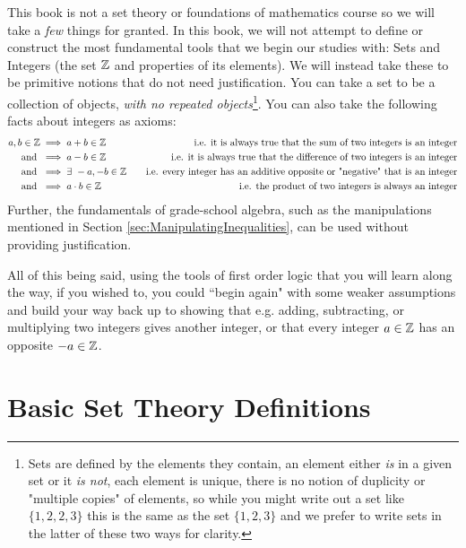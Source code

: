 This book is not a set theory or foundations of mathematics course so we will take a \textit{few} things for granted. In this book, we will not attempt to define or construct the most fundamental tools that we begin our studies with: Sets and Integers (the set ${\mathbb{Z}}$ and properties of its elements). We will instead take these to be primitive notions that do not need justification. You can take a set to be a collection of objects, \textit{with no repeated objects}\footnote{Sets are defined by the elements they contain, an element either \textit{is} in a given set or it \textit{is not}, each element is unique, there is no notion of duplicity or "multiple copies" of elements, so while you might write out a set like $\{1, 2, 2, 3\}$ this is the same as the set $\{1,2,3\}$ and we prefer to write sets in the latter of these two ways for clarity.}. You can also take the following facts about integers as axioms:
\noindent\begin{align}
    a,b\in \Z &\implies a+b\in \Z  \ \ \ &\text{i.e. it is always true that the sum of two integers is an integer}\nonumber \\
    \text{ and } &\implies a-b\in \Z \ \ \ &\text{i.e. it is always true that the difference of two integers is an integer}\nonumber \\
    \text{ and } &\implies \exists \ -a,-b \in \Z \ \ \ &\text{i.e. every integer has an additive opposite or "negative" that is an integer}\nonumber \\
     \text{ and } &\implies a\cdot b\in \Z \ \ \ &\text{i.e. the product of two integers is always an integer}\nonumber
\end{align} 
Further, the fundamentals of grade-school algebra, such as the manipulations mentioned in Section \ref{sec:ManipulatingInequalities}, can be used without providing justification.

All of this being said, using the tools of first order logic that you will learn along the way, if you wished to, you could ``begin again" with some weaker assumptions and build your way back up to showing that e.g. adding, subtracting, or multiplying two integers gives another integer, or that every integer $a\in{\mathbb{Z}}$ has an opposite $-a\in{\mathbb{Z}}$. 
\newpage
\section{Basic Set Theory Definitions}
\label{sec:BasicSetTheory}

